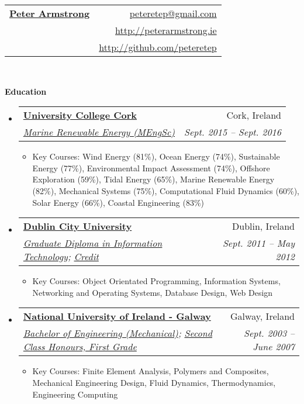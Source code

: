 \documentclass[letterpaper,11pt]{article}
\makeatletter
\newcommand{\resitem}[1]{\item #1 \vspace{-2pt}}
\newcommand{\resheading}[1]{{\large \colorbox{mygrey}{\begin{minipage}{\textwidth}{\textbf{#1 \vphantom{p\^{E}}}}\end{minipage}}}}
\newcommand{\ressubheading}[4]{
\begin{tabular*}{6.5in}{l@{\extracolsep{\fill}}r}
		\textbf{#1} & #2 \\
		\textit{#3} & \textit{#4} \\
\end{tabular*}\vspace{-6pt}}
\makeatother
\begin{document}
\newcommand{\mywebheader}{
\begin{tabular*}{7in}{l@{\extracolsep{\fill}}r}
	\textbf{\href{http://peterarmstrong.ie/}{\LARGE Peter Armstrong}} & \href{mailto:peteretep@gmail.com}{peteretep@gmail.com}\\
	& \href{http://peterarmstrong.ie}{http://peterarmstrong.ie} \\
	& \href{http://github.com/peteretep}{http://github.com/peteretep}
	\end{tabular*}
\\
\vspace{0.1in}}

\mywebheader

\resheading{Education}
	\begin{itemize}
    \item
      \ressubheading{\href{http://www.ucc.ie}{University College Cork}}{Cork, Ireland}{\href{http://www.ucc.ie/en/ckr51/}{Marine Renewable Energy (MEngSc)}}
      {Sept. 2015 -- Sept. 2016}
        { \footnotesize
        \begin{itemize}
        \resitem{Key Courses: Wind Energy (81\%), Ocean Energy (74\%), Sustainable Energy (77\%), Environmental Impact Assessment (74\%), Offshore Exploration (59\%), Tidal Energy (65\%), Marine Renewable Energy (82\%), Mechanical Systems (75\%), Computational Fluid Dynamics (60\%), Solar Energy (66\%), Coastal Engineering (83\%)}
        \end{itemize}
        }

    \item
      \ressubheading{\href{http://www.dcu.ie}{Dublin City University}}{Dublin, Ireland}{\href{https://www.dcu.ie/prospective/deginfo.php?classname=GDF\&originating_school=40}{Graduate Diploma in Information Technology};
      \href{http://peterarmstrong.ie/cv/grad_dip_it_transcript.pdf}{Credit}}
      {Sept. 2011 -- May 2012}
        { \footnotesize
        \begin{itemize}
        \resitem{Key Courses: Object Orientated Programming, Information Systems, Networking and Operating Systems, Database Design, Web Design}
        \end{itemize}
        }

		\item
			\ressubheading{\href{http://www.nuigalway.ie}{National University of Ireland - Galway}}{Galway, Ireland}
			{\href{http://www.nuigalway.ie/courses/undergraduate-courses/mechanical-engineering.html}{Bachelor of Engineering (Mechanical)}; 
			\href{http://peterarmstrong.ie/cv/mech_eng_transcript.jpg}{Second Class Honours, First Grade}}
      {Sept. 2003 -- June 2007}
				{ \footnotesize
				\begin{itemize}
					\resitem{Key Courses: Finite Element Analysis, Polymers and Composites, Mechanical Engineering Design, Fluid Dynamics, Thermodynamics, Engineering Computing }
				\end{itemize}
				}

	\end{itemize} %
\end{document}
